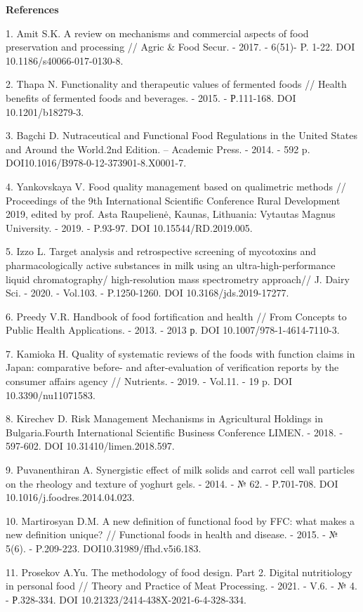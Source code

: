\begin{center}
{\bfseries References}
\end{center}

\begin{references}
1. Amit S.K. A review on mechanisms and commercial aspects of food
preservation and processing // Agric \& Food Secur. - 2017. - 6(51)- P.
1-22. DOI 10.1186/s40066-017-0130-8.

2. Thapa N. Functionality and therapeutic values of fermented foods //
Health benefits of fermented foods and beverages. - 2015. - Р.111-168.
DOI 10.1201/b18279-3.

3. Bagchi D. Nutraceutical and Functional Food Regulations in the United
States and Around the World.2nd Edition. -- Academic Press. - 2014. -
592 p. DOI10.1016/B978-0-12-373901-8.X0001-7.

4. Yankovskaya V. Food quality management based on qualimetric methods
// Proceedings of the 9th International Scientific Conference Rural
Development 2019, edited by prof. Asta Raupelienė, Kaunas, Lithuania:
Vytautas Magnus University. - 2019. - P.93-97. DOI
10.15544/RD.2019.005.

5. Izzo L. Target analysis and retrospective screening of mycotoxins and
pharmacologically active substances in milk using an
ultra-high-performance liquid chromatography/ high-resolution mass
spectrometry approach// J. Dairy Sci. - 2020. - Vol.103. - P.1250-1260.
DOI 10.3168/jds.2019-17277.

6. Preedy V.R. Handbook of food fortification and health // From
Concepts to Public Health Applications. - 2013. - 2013 р. DOI
10.1007/978-1-4614-7110-3.

7. Kamioka H. Quality of systematic reviews of the foods with function
claims in Japan: comparative before- and after-evaluation of
verification reports by the consumer affairs agency // Nutrients. -
2019. - Vol.11. - 19 p. DOI 10.3390/nu11071583.

8. Kirechev D. Risk Management Mechanisms in Agricultural Holdings in
Bulgaria.Fourth International Scientific Business Conference LIMEN. -
2018. - 597-602. DOI 10.31410/limen.2018.597.

9. Puvanenthiran A. Synergistic effect of milk solids and carrot cell
wall particles on the rheology and texture of yoghurt gels. - 2014. - №
62. - P.701-708. DOI 10.1016/j.foodres.2014.04.023.

10. Martirosyan D.M. A new definition of functional food by FFC: what
makes a new definition unique? // Functional foods in health and
disease. - 2015. - № 5(6). - P.209-223. DOI10.31989/ffhd.v5i6.183.

11. Prosekov A.Yu. The methodology of food design. Part 2. Digital
nutritiology in personal food // Theory and Practice of Meat Processing.
- 2021. - V.6. - № 4. - Р.328-334. DOI
10.21323/2414-438X-2021-6-4-328-334.
\end{references}

